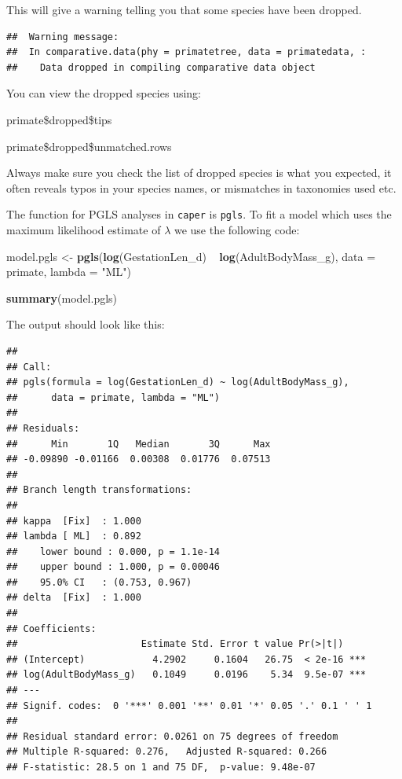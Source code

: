 \documentclass[12pt]{article}
\newcommand{\KeywordTok}[1]{\textcolor[rgb]{0.13,0.29,0.53}{\textbf{{#1}}}}
\newcommand{\DataTypeTok}[1]{\textcolor[rgb]{0.13,0.29,0.53}{{#1}}}
\newcommand{\StringTok}[1]{\textcolor[rgb]{0.31,0.60,0.02}{{#1}}}
\newcommand{\NormalTok}[1]{{#1}}
\begin{document}
This will give a warning telling you that some species have been dropped.

\begin{verbatim}
##  Warning message:
##  In comparative.data(phy = primatetree, data = primatedata, :
##    Data dropped in compiling comparative data object
\end{verbatim}

You can view the dropped species using:

\begin{snugshade}
\begin{Highlighting}[]
\NormalTok{primate\$dropped\$tips}

\NormalTok{primate\$dropped\$unmatched.rows}
\end{Highlighting}
\end{snugshade}

\begin{framed}
Always make sure you check the list of dropped species is what you expected, it often reveals typos in your species names, or mismatches in taxonomies used etc.
\end{framed}

\newpage
The function for PGLS analyses in \texttt{caper} is \texttt{pgls}. To fit a model which uses the maximum likelihood estimate of $\lambda$ we use the following code:

\begin{snugshade}
\begin{Highlighting}[]
\NormalTok{model.pgls <-}\StringTok{ }\KeywordTok{pgls}\NormalTok{(}\KeywordTok{log}\NormalTok{(GestationLen_d) ~}\StringTok{ }\KeywordTok{log}\NormalTok{(AdultBodyMass_g), }
                   \DataTypeTok{data =} \NormalTok{primate, }\DataTypeTok{lambda =} \StringTok{"ML"}\NormalTok{)}

\KeywordTok{summary}\NormalTok{(model.pgls)}
\end{Highlighting}
\end{snugshade}

The output should look like this:

\begin{verbatim}
## 
## Call:
## pgls(formula = log(GestationLen_d) ~ log(AdultBodyMass_g), 
##      data = primate, lambda = "ML")
## 
## Residuals:
##      Min       1Q   Median       3Q      Max 
## -0.09890 -0.01166  0.00308  0.01776  0.07513 
## 
## Branch length transformations:
## 
## kappa  [Fix]  : 1.000
## lambda [ ML]  : 0.892
##    lower bound : 0.000, p = 1.1e-14
##    upper bound : 1.000, p = 0.00046
##    95.0% CI   : (0.753, 0.967)
## delta  [Fix]  : 1.000
## 
## Coefficients:
##                      Estimate Std. Error t value Pr(>|t|)    
## (Intercept)            4.2902     0.1604   26.75  < 2e-16 ***
## log(AdultBodyMass_g)   0.1049     0.0196    5.34  9.5e-07 ***
## ---
## Signif. codes:  0 '***' 0.001 '**' 0.01 '*' 0.05 '.' 0.1 ' ' 1
## 
## Residual standard error: 0.0261 on 75 degrees of freedom
## Multiple R-squared: 0.276,   Adjusted R-squared: 0.266 
## F-statistic: 28.5 on 1 and 75 DF,  p-value: 9.48e-07
\end{verbatim}
\end{document}
